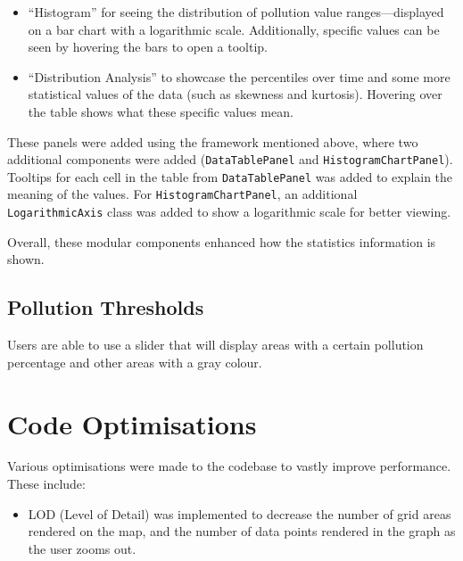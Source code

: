 \documentclass[10pt, a4paper]{scrartcl}
\begin{document}
\begin{multicols}{2}
\vspace{-0.1em}

\begin{itemize}
    \itemsep-0.3em
    \item “Histogram” for seeing the distribution of pollution value ranges—displayed on a bar chart with a logarithmic scale.
    Additionally, specific values can be seen by hovering the bars to open a tooltip.
    
    \item “Distribution Analysis” to showcase the percentiles over time and some more statistical values of the data
    (such as skewness and kurtosis). Hovering over the table shows what these specific values mean.
\end{itemize}

\vspace{-0.1em}
    
\noindent These panels were added using the framework mentioned above, where two additional components were added (\verb|DataTablePanel|
and \verb|HistogramChartPanel|). Tooltips for each cell in the table from \verb|DataTablePanel| was added to explain the meaning
of the values. For \verb|HistogramChartPanel|, an additional \verb|LogarithmicAxis| class was added to show a logarithmic scale
for better viewing.

\noindent Overall, these modular components enhanced how the statistics information is shown.

\subsection{Pollution Thresholds}

\noindent Users are able to use a slider that will display areas with a certain pollution percentage and other areas with a gray colour.

\section{Code Optimisations}

Various optimisations were made to the codebase to vastly improve performance. These include:

\begin{itemize}
    \itemsep-0.3em
    \item LOD (Level of Detail) was implemented to decrease the number of grid areas rendered on the map, and the number of
    data points rendered in the graph as the user zooms out. 
    

\end{itemize}
\end{multicols}
\end{document}
